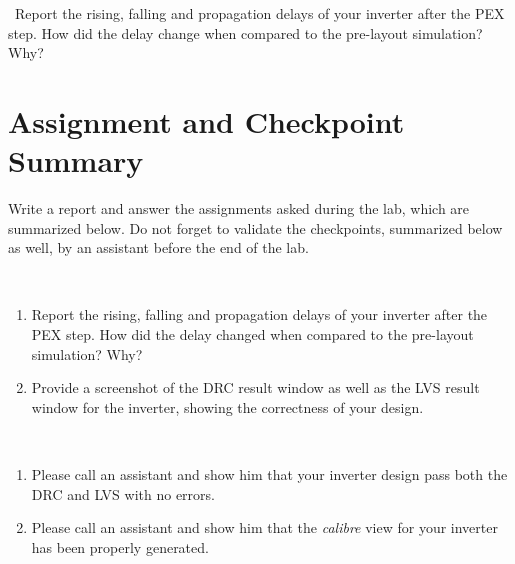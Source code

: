 	\begin{exercise}\ 
Report the rising, falling and propagation delays of your inverter after the PEX step. How did the delay change when compared to the pre-layout simulation? Why?		
\end{exercise}
\clearpage


\section{Assignment and Checkpoint Summary}
Write a report and answer the assignments asked during the lab, which are summarized below. Do not forget to validate the checkpoints, summarized below as well, by an assistant before the end of the lab.


	\begin{exercisesum}\	
			\vspace{-2mm}
	\begin{enumerate}
\item Report the rising, falling and propagation delays of your inverter after the PEX step. How did the delay changed when compared to the pre-layout simulation? Why?		
\item Provide a screenshot of the DRC result window as well as the LVS result window for the inverter, showing the correctness of your design.			
	\end{enumerate}
\vspace{-5mm}
\end{exercisesum}	

\begin{checkpointsum}\
	\vspace{-2mm}
		\begin{enumerate}
	\item Please call an assistant and show him that your inverter design pass both the DRC and LVS with no errors.
	\item Please call an assistant and show him that the \textit{calibre} view for your inverter has been properly generated.
		\end{enumerate}
	\vspace{-5mm}
\end{checkpointsum}




